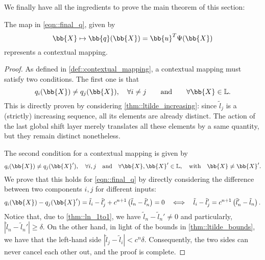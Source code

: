 We finally have all the ingredients to prove the main theorem of this section:
\begin{theorem}
    The map in \cref{eqn::final_q}, given by
    $$\bb{X}\mapsto\bb{q}(\bb{X}) = \bb{u}^T\Psi(\bb{X})$$
    represents a contextual mapping.
\end{theorem}
\begin{proof}
    As defined in \cref{def::contextual_mapping}, a contextual mapping must satisfy two conditions. The first one is that
    \begin{equation}
        q_i(\bb{X})\neq q_j(\bb{X}), \quad\forall i\neq j\qquad\text{and}\qquad\forall\bb{X}\in\mathbb{L}.
    \end{equation}
    This is directly proven by considering \cref{thm::ltilde_increasing}: since $\tilde{l}_j$ is a (strictly) increasing sequence, all its elements are already distinct. The action of the last global shift layer merely translates all these elements by a same quantity, but they remain distinct nonetheless.
    
    The second condition for a contextual mapping is given by
    \begin{equation}
        q_i(\bb{X})\neq q_j(\bb{X}'),\quad\forall i,j\quad\text{and}\quad\forall\bb{X},\bb{X}'\in\mathbb{L},\quad \text{with}\quad\bb{X}\neq\bb{X}'.
    \end{equation}
    We prove that this holds for \cref{eqn::final_q} by directly considering the difference between two components $i,j$ for different inputs:
    \begin{equation}
        q_i(\bb{X})- q_j(\bb{X}') = \tilde{l}_i-\tilde{l}_j' + c^{n+1}\left(\tilde{l}_n-\tilde{l}_n'\right)=0
        \quad\Longleftrightarrow\quad \tilde{l}_i-\tilde{l}_j' = c^{n+1}\left(\tilde{l}_n'-\tilde{l}_n\right).
    \end{equation}
    Notice that, due to \cref{thm::ln_1to1}, we have $\tilde{l}_n-\tilde{l}_n'\neq0$ and particularly, $|\tilde{l}_n-\tilde{l}_n'|\geq\delta$. On the other hand, in light of the bounds in \cref{thm::ltilde_bounds}, we have that the left-hand side $|\tilde{l}_j-\tilde{l}_i|<c^{n}\delta$. Consequently, the two sides can never cancel each other out, and the proof is complete.
\end{proof}

